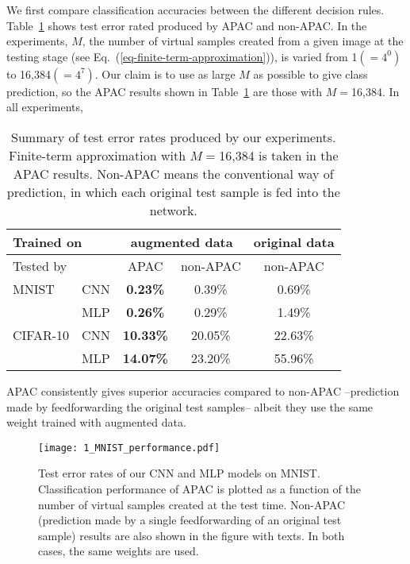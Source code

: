 \documentclass[10pt,twocolumn,letterpaper]{article}
\begin{document}
We first compare classification accuracies between the different decision rules.
Table~\ref{table-summary} shows test error rated produced by APAC and non-APAC.
In the experiments, $M$, the number of virtual samples created from a given image at the testing stage
(see Eq.~(\ref{eq-finite-term-approximation})), is varied from 1$(=4^0)$ to 16,384$(=4^7)$.
Our claim is to use as large $M$ as possible to give class prediction,
so the APAC results shown in Table~\ref{table-summary} are those with $M=$16,384.
In all experiments, 
\begin{table}[h]
\caption{Summary of test error rates produced by our experiments. 
Finite-term approximation with $M=$16,384 is taken in the APAC results.
Non-APAC means the conventional way of prediction, in which each original test sample is fed into the network.}
\begin{center}
{\small
\begin{tabular}{|l|c|c|c|c|}
\hline
\multicolumn{2}{|l|}{Trained on} & \multicolumn{2}{|c|}{augmented data} & original data\\
\hline
\multicolumn{2}{|l|}{Tested by}  & APAC & non-APAC & non-APAC\\
\hline\hline
MNIST    & CNN &  {\bf 0.23\%}  & 0.39\%      & 0.69\% \\
& MLP &  {\bf 0.26\%}  & 0.29\%      & 1.49\% \\
\hline
CIFAR-10 & CNN &  {\bf 10.33\%}  & 20.05\%    & 22.63\% \\
& MLP &  {\bf 14.07\%}  & 23.20\%    & 55.96\% \\
\hline
\end{tabular}
}
\end{center}
\label{table-summary}
\end{table}
APAC consistently gives superior accuracies compared to non-APAC
--prediction made by feedforwarding the original test samples-- 
albeit they use the same weight trained with augmented data.

\begin{figure}[t]
\begin{center}
\texttt{[image: 1\_MNIST\_performance.pdf]}
\end{center}
\caption{Test error rates of our CNN and MLP models on MNIST.
Classification performance of APAC is plotted as a function of the number of virtual samples created at the test time.
Non-APAC (prediction made by a single feedforwarding of an original test sample) results are also shown 
in the figure with texts.
In both cases, the same weights are used.}
\label{fig-test-error-rate-mnist}
\end{figure}
\end{document}
